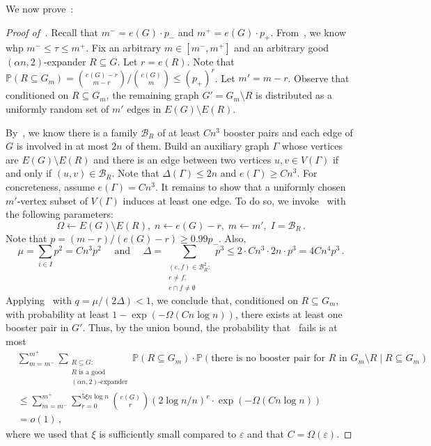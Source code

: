 \documentclass[reqno,final,a4paper]{amsart}
\numberwithin{equation}{section}
\theoremstyle{definition}
\theoremstyle{remark}
\renewcommand{\Pr}{\mathbb{P}}
\newcommand{\eps}{\varepsilon}
\def\calB{\mathcal{B}}
\begin{document}
We now prove~:
\begin{proof}[Proof of~]
    Recall that $m^- = e(G)\cdot p_-$ and $m^+ = e(G)\cdot p_+$. From~, we know whp $m^-\leq \tau\leq m^+$. 
    Fix an arbitrary $m \in [m^-,m^+]$ and an arbitrary good $(\alpha n,2)$-expander $R\subseteq G$. Let $r = e(R)$. Note that $\Pr(R\subseteq G_{m}) = \binom{e(G)-r}{m-r}/\binom{e(G)}{m}\leq (p_+)^r$. Let $m' = m - r$. Observe that conditioned on $R\subseteq G_m$, the remaining graph $G' = G_m\setminus R$ is distributed as a uniformly random set of $m'$ edges in $E(G)\setminus E(R)$.  
    
    By~, we know there is a family $\calB_R$ of at least $Cn^3$ booster pairs and each edge of $G$ is involved in at most $2n$ of them. Build an auxiliary graph $\Gamma$ whose vertices are $E(G)\setminus E(R)$ and there is an edge between two vertices $u,v\in V(\Gamma)$ if and only if $(u,v)\in \calB_R$. Note that $\Delta(\Gamma)\leq 2n$ and $e(\Gamma)\geq Cn^3$. 
   For concreteness, assume $e(\Gamma)= Cn^3$.
    It remains to show that a uniformly chosen $m'$-vertex subset of $V(\Gamma)$ induces at least one edge. To do so, we invoke~ with the following parameters: 
    \[
        \Omega \leftarrow E(G)\setminus E(R),\; n\leftarrow e(G) - r,\; m\leftarrow m',\; I = \calB_R\,.
    \]
    Note that $p = (m-r)/(e(G)-r)\geq 0.99p_-$. Also, 
    \[
        \mu = \sum_{i\in I}p^2 = Cn^3 p^2\quad\text{ and }\quad \Delta = \sum_{\substack{(e,f)\in \calB_R^2:\\ e\neq f, \\e\cap f\neq \emptyset}}p^{3} \leq  2\cdot Cn^3 \cdot 2n\cdot p^3 = 4Cn^4 p^3\,.
    \]
    Applying~ with $q = \mu/(2\Delta)<1$, we conclude that, conditioned on $R\subseteq G_m$, with probability at least $1-\exp(-\Omega(Cn\log n))$, there exists at least one booster pair in $G'$.
    Thus, by the union bound, the probability that~ fails is at most 
    \begin{align*}
        &\sum_{m=m^-}^{m^+}\sum_{\substack{R\subseteq G:\\ \text{$R$ is a good}\\\text{$(\alpha n,2)$-expander}}} \Pr(R\subseteq G_m)\cdot \Pr(\text{there is no booster pair for $R$ in $G_m\setminus R$}\mid R\subseteq G_m)\\
        &\leq  \sum_{m=m^-}^{m^+}\sum_{r=0}^{5\xi n\log n}\binom{e(G)}{r}(2\log n/n)^r\cdot \exp(-\Omega(Cn\log n))\\
        &= o(1)\,,
    \end{align*}
    where we used that $\xi$ is sufficiently small compared to $\eps$ and that $C=\Omega(\eps)$.
\end{proof}
\end{document}
